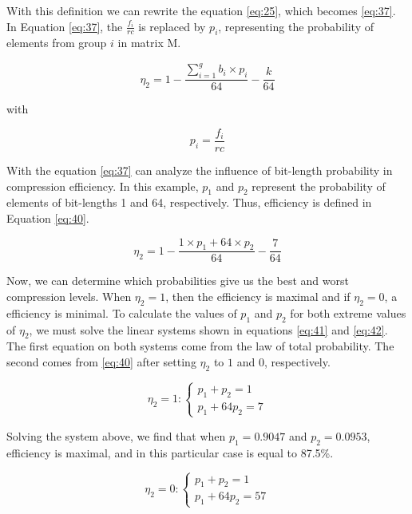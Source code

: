 \documentclass[10pt]{article}
\begin{document}
With this definition we can rewrite the equation \ref{eq:25}, which becomes \ref{eq:37}. In Equation \ref{eq:37}, the $\frac{f_i}{rc}$ is replaced by $p_i$, representing the probability of elements from group $i$ in matrix M.

\begin{equation}\label{eq:37}
 \eta_2 = 1 - \frac{\sum_{i=1}^{g}  b_i \times p_i }{64} - \frac{k}{64} 
\end{equation}

\noindent with

\begin{equation}\label{eq:38}
 p_i = \frac{f_i}{rc}
\end{equation}

With the equation \ref{eq:37} can analyze the influence of bit-length probability in compression efficiency. In this example, $p_1$ and $p_2$ represent the probability of elements of bit-lengths 1 and 64, respectively. Thus, efficiency is defined in Equation \ref{eq:40}.

\begin{equation}\label{eq:40}
 \eta_2 = 1 - \frac{1 \times p_1  + 64 \times p_2}{64} - \frac{7}{64} 
\end{equation}

Now, we can determine which probabilities give us the best and worst compression levels. When $\eta_2=1$, then the efficiency is maximal and if $\eta_2=0$, a efficiency is minimal. To calculate the values ​​of $p_1$ and $p_2$ for both extreme values of $\eta_2$,  we must solve the linear systems shown in equations \ref{eq:41} and \ref{eq:42}. The first equation on both systems come from the law of total probability. The second comes from \ref{eq:40} after setting $\eta_2$ to $1$ and $0$, respectively.

\begin{equation}\label{eq:41}
  \eta_2 = 1 :\left
  \{\begin{matrix}
    p_1 + p_2 = 1\\ 
    p_1+64p_2 = 7
  \end{matrix}
  \right.
\end{equation}

Solving the system above, we find that  when $p_1=0.9047$ and $p_2=0.0953$, efficiency is maximal, and in this particular case is equal to 87.5\%. 

\begin{equation}\label{eq:42}
  \eta_2 = 0 :\left
  \{\begin{matrix}
    p_1 + p_2 = 1\\ 
    p_1+64p_2 = 57
  \end{matrix}
  \right.
\end{equation}
\end{document}
